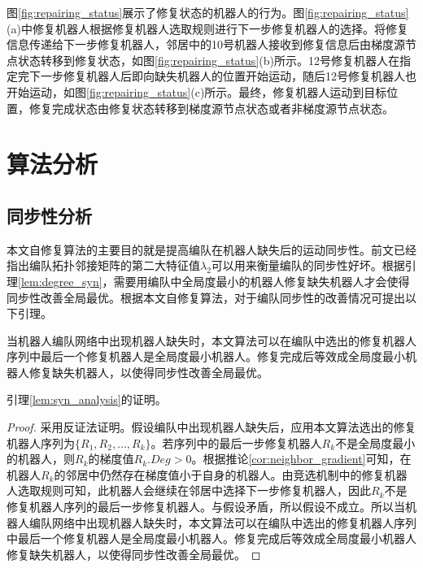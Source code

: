 图\ref{fig:repairing_status}展示了修复状态的机器人的行为。图\ref{fig:repairing_status}(a)中修复机器人根据修复机器人选取规则进行下一步修复机器人的选择。将修复信息传递给下一步修复机器人，邻居中的10号机器人接收到修复信息后由梯度源节点状态转移到修复状态，如图\ref{fig:repairing_status}(b)所示。12号修复机器人在指定完下一步修复机器人后即向缺失机器人的位置开始运动，随后12号修复机器人也开始运动，如图\ref{fig:repairing_status}(c)所示。最终，修复机器人运动到目标位置，修复完成状态由修复状态转移到梯度源节点状态或者非梯度源节点状态。

\begin{figure*}[!htbp]
	\centering
		
\end{figure*}

\section{算法分析}

\subsection{同步性分析}
本文自修复算法的主要目的就是提高编队在机器人缺失后的运动同步性。前文已经指出编队拓扑邻接矩阵的第二大特征值$\lambda_2$可以用来衡量编队的同步性好坏。根据引理\ref{lem:degree_syn}，需要用编队中全局度最小的机器人修复缺失机器人才会使得同步性改善全局最优。根据本文自修复算法，对于编队同步性的改善情况可提出以下引理。
\begin{lem}
	\label{lem:syn_analysis}
	当机器人编队网络中出现机器人缺失时，本文算法可以在编队中选出的修复机器人序列中最后一个修复机器人是全局度最小机器人。修复完成后等效成全局度最小机器人修复缺失机器人，以使得同步性改善全局最优。
	
	引理\ref{lem:syn_analysis}的证明。
	
	\begin{proof}
		采用反证法证明。假设编队中出现机器人缺失后，应用本文算法选出的修复机器人序列为$\{R_1,R_2,\dots,R_k\}$。若序列中的最后一步修复机器人$R_k$不是全局度最小的机器人，则$R_k$的梯度值$R_k.Deg > 0$。根据推论\ref{cor:neighbor_gradient}可知，在机器人$R_k$的邻居中仍然存在梯度值小于自身的机器人。由竞选机制中的修复机器人选取规则可知，此机器人会继续在邻居中选择下一步修复机器人，因此$R_k$不是修复机器人序列的最后一步修复机器人。与假设矛盾，所以假设不成立。所以当机器人编队网络中出现机器人缺失时，本文算法可以在编队中选出的修复机器人序列中最后一个修复机器人是全局度最小机器人。修复完成后等效成全局度最小机器人修复缺失机器人，以使得同步性改善全局最优。
	\end{proof}	
\end{lem}

